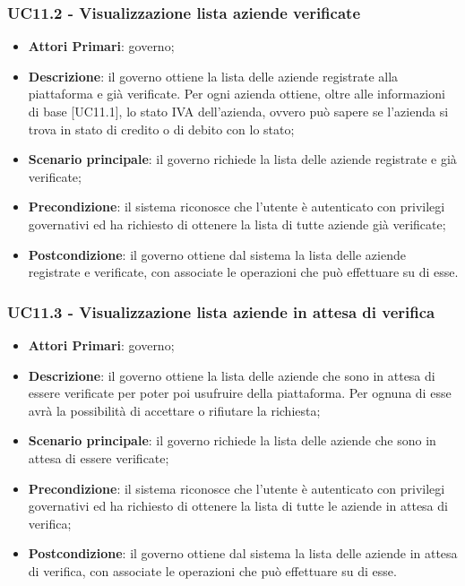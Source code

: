 \subsubsection{UC11.2 - Visualizzazione lista aziende verificate}
 \begin{itemize}
	\item \textbf{Attori Primari}: governo;
	\item \textbf{Descrizione}: il governo ottiene la lista delle aziende registrate alla piattaforma e già verificate. Per ogni azienda ottiene, oltre alle informazioni di base [UC11.1], lo stato IVA dell'azienda, ovvero può sapere se l'azienda si trova in stato di credito o di debito con lo stato;
	\item \textbf{Scenario principale}: il governo richiede la lista delle aziende registrate e  già verificate;
	\item \textbf{Precondizione}: il sistema riconosce che l'utente è autenticato con privilegi governativi ed ha richiesto di ottenere la lista di tutte aziende già verificate;
	\item \textbf{Postcondizione}: il governo ottiene dal sistema la lista delle aziende registrate e verificate, con associate le operazioni che può effettuare su di esse.
\end{itemize}
\subsubsection{UC11.3 - Visualizzazione lista aziende in attesa di verifica}

\begin{itemize}
	\item \textbf{Attori Primari}: governo;
	\item \textbf{Descrizione}: il governo ottiene la lista delle aziende che sono in attesa di essere verificate per poter poi usufruire della piattaforma. Per ognuna di esse avrà la possibilità di accettare o rifiutare la richiesta;
	\item \textbf{Scenario principale}: il governo richiede la lista delle aziende che sono in attesa di essere verificate;
	\item \textbf{Precondizione}: il sistema riconosce che l'utente è autenticato con privilegi governativi ed ha richiesto di ottenere la lista di tutte le aziende in attesa di verifica;
	\item \textbf{Postcondizione}: il governo ottiene dal sistema la lista delle aziende in attesa di verifica, con associate le operazioni che può effettuare su di esse.
\end{itemize}
